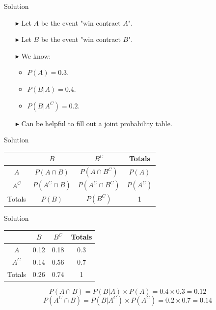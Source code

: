 \documentclass[12pt]{beamer}
\begin{document}
\begin{frame}{Solution}
	\begin{itemize}
		\item[\color{blue}$\blacktriangleright$] Let $A$ be the event "win contract $A$".
		\item[\color{blue}$\blacktriangleright$] Let $B$ be the event "win contract $B$".
		\item[\color{blue}$\blacktriangleright$] We know:
		\begin{itemize}
			\item $P(A)=0.3$.
			\item $P(B|A)=0.4$.
			\item $P(B|A^C)=0.2$.
		\end{itemize}
		\item[\color{blue}$\blacktriangleright$] Can be helpful to fill out a joint probability table.
	\end{itemize}
\end{frame}
\begin{frame}{Solution}
		\begin{center}
	\begin{tabular}{cccc}
		\toprule
		&$B$&$B^C$&Totals\\
		\hline
		$A$&$P(A\cap B)$&$P(A\cap B^C)$&$P(A)$\\
		$A^C$&$P(A^C\cap B)$&$P(A^C\cap B^C)$&$P(A^C)$\\
		\hline
		Totals&$P(B)$&$P(B^C)$&1\\
		\bottomrule
	\end{tabular}
\end{center}
\end{frame}
\begin{frame}{Solution}
	\begin{center}
		\begin{tabular}{cccc}
			\toprule
			&$B$&$B^C$&Totals\\
			\hline
			$A$&0.12&0.18&0.3\\
			$A^C$&0.14&0.56&0.7\\
			\hline
			Totals&0.26&0.74&1\\
			\bottomrule
		\end{tabular}
	\end{center}
	$$P(A\cap B)=P(B|A)\times P(A)=0.4\times0.3=0.12$$
	$$P(A^C\cap B)=P(B|A^C)\times P(A^C)=0.2\times0.7=0.14$$
\end{frame}
\end{document}
